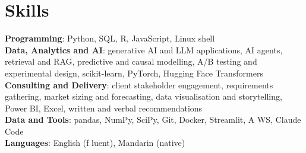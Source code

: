\documentclass[letterpaper,11pt]{article}
\begin{document}
\section{\textbf{Skills}}
 \begin{itemize}[leftmargin=0.15in, label={}]
    \small{\item{
     \textbf{Programming}{: Python, SQL, R, JavaScript, Linux shell} \\
     \textbf{Data, Analytics and AI}{: generative AI and LLM applications, AI agents, retrieval and RAG, predictive and causal modelling, A/B testing and experimental design, scikit-learn, PyTorch, Hugging Face Transformers} \\
     \textbf{Consulting and Delivery}{: client stakeholder engagement, requirements gathering, market sizing and forecasting, data visualisation and storytelling, Power BI, Excel, written and verbal recommendations} \\
     \textbf{Data and Tools}{: pandas, NumPy, SciPy, Git, Docker, Streamlit, A\kern0pt WS, Claude Code} \\
     \textbf{Languages}{: English (f\kern0pt luent), Mandarin (native)}}}

 \end{itemize}
\end{document}
